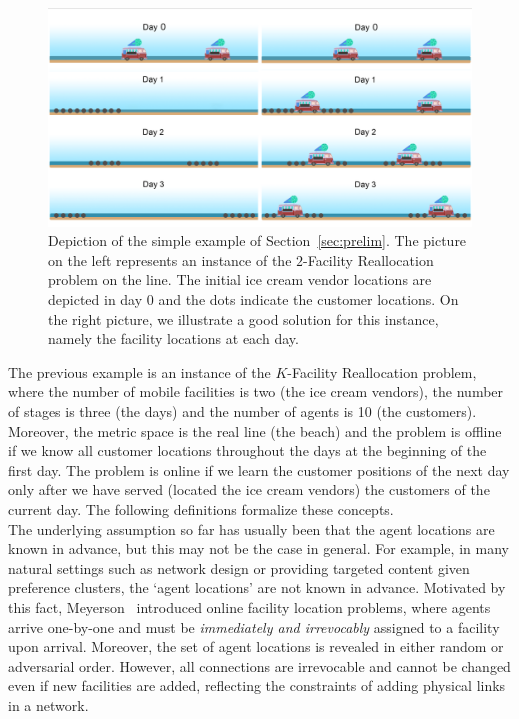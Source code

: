 \begin{figure}
\begin{center}

\includegraphics[scale=1.1]{chapters/previous_work/icecream.png}
\end{center}
\caption{Depiction of the simple example of Section~\ref{sec:prelim}. The picture on the left represents an instance of the $2$-Facility Reallocation problem on the line. The initial ice cream vendor locations are depicted in day 0 and the dots indicate the customer locations. On the right picture, we illustrate a good solution for this instance, namely the facility locations at each day.}
\label{example}
\end{figure}
The previous example is an instance of the $K$-Facility Reallocation problem, where the number of mobile facilities is two (the ice cream vendors), the number of stages is three (the days) and the number of agents is 10 (the customers). Moreover, the metric space is the real line (the beach) and the problem is  offline if we know all customer locations throughout the days at the beginning of the first day. The problem is online if we learn the customer positions of the next day only after we have served (located the ice cream vendors) the customers of the current day. The following definitions formalize these concepts. \\

The underlying assumption so far has usually been that the agent locations are known in advance, but this may not be the case in general. For example, in many natural settings such as network design or providing targeted content given preference clusters, the `agent locations' are not known in advance. Motivated by this fact, Meyerson~\cite{M2001} introduced online facility location problems, where agents arrive one-by-one and must be 
\emph{immediately and irrevocably} assigned to a facility upon arrival. Moreover, the set of agent locations is revealed in either random or adversarial order.  However, all connections are irrevocable and cannot be changed even if  new facilities are added, reflecting the constraints of adding physical links in a network. \\

